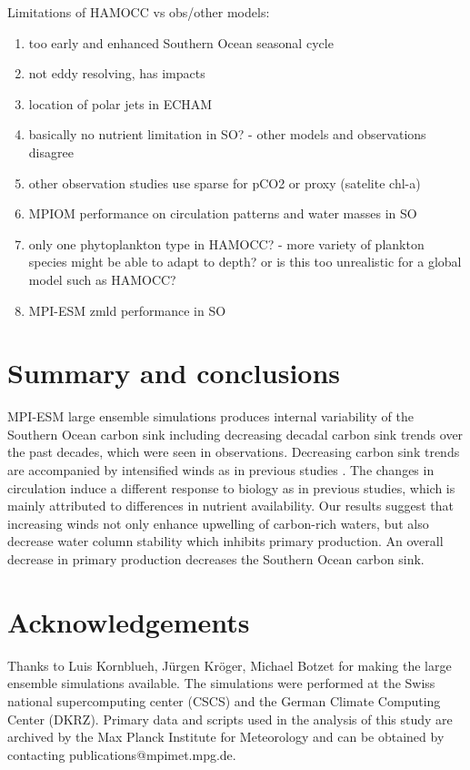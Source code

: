 \documentclass[12pt]{article}
\begin{document}
Limitations of HAMOCC vs obs/other models:
\begin{enumerate}
\item too early and enhanced Southern Ocean seasonal cycle \citep{Nevison2016}
\item not eddy resolving, has impacts \citep{somestudy}
\item location of polar jets in ECHAM %
\item basically no nutrient limitation in SO? - other models and observations disagree
\item other observation studies use sparse for pCO2 or proxy (satelite chl-a)
\item MPIOM performance on circulation patterns and water masses in SO %
\item only one phytoplankton type in HAMOCC? - more variety of plankton species might be able to adapt to depth? or is this too unrealistic for a global model such as HAMOCC?
\item MPI-ESM zmld performance in SO \citep{Sallee2013}
\end{enumerate} 



\section{Summary and conclusions}

MPI-ESM large ensemble simulations produces internal variability of the Southern Ocean carbon sink including decreasing decadal carbon sink trends over the past decades, which were seen in observations. Decreasing carbon sink trends are accompanied by intensified winds as in previous studies \citep{LeQuere2007,Lovenduski2008}. The changes in circulation induce a different response to biology as in previous studies\citep{Lovenduski2005,Hauck2013,wang2012}, which is mainly attributed to differences in nutrient availability. Our results suggest that increasing winds not only enhance upwelling of carbon-rich waters, but also decrease water column stability which inhibits primary production. An overall decrease in primary production decreases the Southern Ocean carbon sink. 


\section*{Acknowledgements}
Thanks to Luis Kornblueh, J{\"u}rgen Kr{\"o}ger, Michael Botzet for making the large ensemble simulations available. The simulations were performed at the Swiss national supercomputing center (CSCS) and the German Climate Computing Center (DKRZ). Primary data and scripts used in the analysis of this study are archived by the Max Planck Institute for Meteorology and can be obtained by contacting publications@mpimet.mpg.de.
\end{document}
